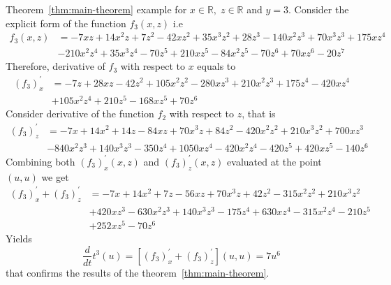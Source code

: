 \begin{example}
    \normalfont
    Theorem~\ref{thm:main-theorem} example for $x\in\mathbb{R}, \; z\in \mathbb{R}$ and $y=3$.
    Consider the explicit form of the function $f_{3} (x, z)$ i.e
    \begin{align*}
        f_3 (x, z) &= -7 x z + 14 x^2 z + 7 z^2 - 42 x z^2 + 35 x^3 z^2 + 28 z^3 -140 x^2 z^3 + 70 x^3 z^3 + 175 x z^4 \\
        &- 210 x^2 z^4 + 35 x^3 z^4 -70 z^5 + 210 x z^5 - 84 x^2 z^5 - 70 z^6 + 70 x z^6 - 20 z^7
    \end{align*}
    Therefore, derivative of $f_{3}$ with respect to $x$ equals to
    \begin{align*}
    (f_3)
        ^{'}_{x} &= -7 z + 28 x z - 42 z^2 + 105 x^2 z^2 - 280 x z^3 + 210 x^2 z^3 + 175 z^4 - 420 x z^4 \\
        &+ 105 x^2 z^4 + 210 z^5 - 168 x z^5 + 70 z^6
    \end{align*}
    Consider derivative of the function $f_2$ with respect to $z$, that is
    \begin{align*}
    (f_3)
        ^{'}_{z} &= -7 x + 14 x^2 + 14 z - 84 x z + 70 x^3 z + 84 z^2 - 420 x^2 z^2 + 210 x^3 z^2 + 700 x z^3 \\
        &- 840 x^2 z^3 + 140 x^3 z^3 - 350 z^4 + 1050 x z^4 - 420 x^2 z^4 - 420 z^5 + 420 x z^5 - 140 z^6
    \end{align*}
    Combining both $(f_3)^{'}_{x} (x, z)$ and $(f_3)^{'}_{z} (x, z)$ evaluated at the point $(u, u)$ we get
    \begin{align*}
    (f_3)
        ^{'}_{x} + (f_3)^{'}_{z} &= -7 x + 14 x^2 + 7 z - 56 x z + 70 x^3 z + 42 z^2 - 315 x^2 z^2 + 210 x^3 z^2 \\
        &+ 420 x z^3 - 630 x^2 z^3 + 140 x^3 z^3 - 175 z^4 + 630 x z^4 - 315 x^2 z^4 - 210 z^5 \\
        &+ 252 x z^5 - 70 z^6
    \end{align*}
    Yields
    \begin{equation*}
        \frac{d}{dt} t^{3} (u) = [(f_3) ^{'}_{x} + (f_3)^{'}_{z}] (u,u) = 7 u^6
    \end{equation*}
    that confirms the results of the theorem~\ref{thm:main-theorem}.
\end{example}